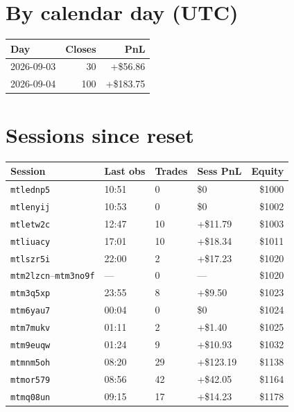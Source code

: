 \documentclass[11pt,a4paper]{article}
\begin{document}
\section{By calendar day (UTC)}
\begin{table}[h]
\centering
\begin{tabular}{@{}lrr@{}}
\toprule
\textbf{Day} & \textbf{Closes} & \textbf{PnL} \\
\midrule
2026-09-03 & 30 & +\$56.86 \\
2026-09-04 & 100 & +\$183.75 \\
\bottomrule
\end{tabular}
\end{table}

\section{Sessions since reset}
\begin{longtable}{@{}llllr@{}}
\toprule
\textbf{Session} & \textbf{Last obs} & \textbf{Trades} & \textbf{Sess PnL} & \textbf{Equity} \\
\midrule
\endhead
\texttt{mtlednp5} & 10:51 & 0 & \$0 & \$1000 \\
\texttt{mtlenyij} & 10:53 & 0 & \$0 & \$1002 \\
\texttt{mtletw2c} & 12:47 & 10 & +\$11.79 & \$1003 \\
\texttt{mtliuacy} & 17:01 & 10 & +\$18.34 & \$1011 \\
\texttt{mtlszr5i} & 22:00 & 2 & +\$17.23 & \$1020 \\
\texttt{mtm2lzcn}--\texttt{mtm3no9f} & --- & 0 & --- & \$1020 \\
\texttt{mtm3q5xp} & 23:55 & 8 & +\$9.50 & \$1023 \\
\texttt{mtm6yau7} & 00:04 & 0 & \$0 & \$1024 \\
\texttt{mtm7mukv} & 01:11 & 2 & +\$1.40 & \$1025 \\
\texttt{mtm9euqw} & 01:24 & 9 & +\$10.93 & \$1032 \\
\texttt{mtmnm5oh} & 08:20 & 29 & +\$123.19 & \$1138 \\
\texttt{mtmor579} & 08:56 & 42 & +\$42.05 & \$1164 \\
\texttt{mtmq08un} & 09:15 & 17 & +\$14.23 & \$1178 \\
\bottomrule
\end{longtable}
\end{document}

